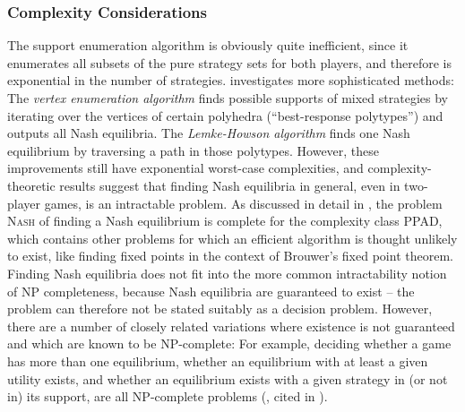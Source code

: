 \documentclass[a4paper]{scrreprt}
\begin{document}
    \subsubsection{Complexity Considerations}
    The support enumeration algorithm is obviously quite inefficient, since it enumerates all subsets of the pure strategy sets for both players, and therefore is exponential in the number of strategies.
    \cite{bib:nisanAlgorithmicGameTheoryCh3EquilibriumComputation} investigates more sophisticated methods: The \emph{vertex enumeration algorithm} finds possible supports of mixed strategies by iterating over the vertices of certain polyhedra (“best-response polytypes”) and outputs all Nash equilibria.
    The \emph{Lemke-Howson algorithm} finds one Nash equilibrium by traversing a path in those polytypes.
    However, these improvements still have exponential worst-case complexities, and complexity-theoretic results suggest that finding Nash equilibria in general, even in two-player games, is an intractable problem. As discussed in detail in \cite{bib:nisanAlgorithmicGameTheoryCh2ComplexityNash}, the problem \textsc{Nash} of finding a Nash equilibrium is complete for the complexity class PPAD, which contains other problems for which an efficient algorithm is thought unlikely to exist, like finding fixed points in the context of Brouwer's fixed point theorem.
    Finding Nash equilibria does not fit into the more common intractability notion of NP completeness, because Nash equilibria are guaranteed to exist -- the problem can therefore not be stated suitably as a decision problem. However, there are a number of closely related variations where existence is not guaranteed and which are known to be NP-complete: %
    For example, deciding whether a game has more than one equilibrium, whether an equilibrium with at least a given utility exists, and whether an equilibrium exists with a given strategy in (or not in) its support, are all NP-complete problems (\cite{bib:gilboaEquilibriaComplexityConsiderations}, cited in \cite{bib:nisanAlgorithmicGameTheoryCh2ComplexityNash}).
    
    
    
\end{document}
